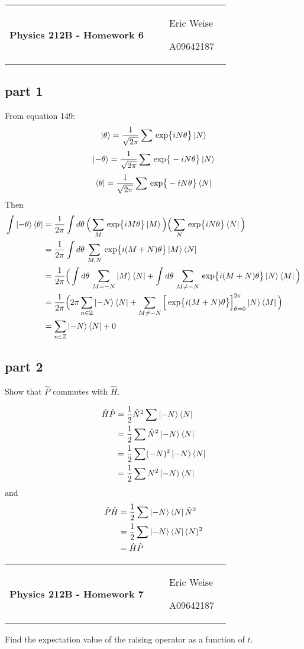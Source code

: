 \documentclass{article}
\newcommand{\assignment}[1]{
    \newpage
    \begin{tabular}{p{0.65\linewidth}p{0.25\linewidth}}
        {\bf\LARGE Physics 212B - Homework #1 }
        &
        \parbox[b]{0.24\textwidth}{
            \hfill Eric Weise

            \hfill A09642187
            }
    \end{tabular}
    \vspace{12pt}
    \newline
}
\newcommand{\D}[1]{{d#1 \,}}
\renewcommand{\exp}[1]{\,\text{exp} \big\{ #1 \big\} }
\begin{document}
\assignment{6}
\subsection*{part 1}
From equation 149:
\[ \ket{\theta} = \frac{1}{\sqrt{2\pi}} \sum \exp{iN\theta} \ket{N} \]
\[ \ket{-\theta} = \frac{1}{\sqrt{2\pi}} \sum \exp{-iN\theta} \ket{N} \]
\[ \bra{\theta} = \frac{1}{\sqrt{2\pi}} \sum \exp{-iN\theta} \bra{N} \]
Then
\begin{align*}
    \int \ket{-\theta}\bra{\theta}
    &= \frac{1}{2\pi} \int \D{\theta} \Big( \sum_M\exp{iM\theta}\ket{M} \Big) \Big( \sum_N \exp{iN\theta}\bra{N} \Big) \\
    &= \frac{1}{2\pi} \int \D{\theta} \sum_{M,N}\exp{i(M+N)\theta}\ket{M}\bra{N} \\
    &= \frac{1}{2\pi} \Big( \int \D{\theta} \sum_{M=-N}\ket{M}\bra{N} + \int \D{\theta} \sum_{M\neq-N} \exp{i(M+N)\theta}\ket{N}\bra{M} \Big) \\
    &= \frac{1}{2\pi} \Big( 2\pi \sum_{n\in\mathbb{Z}} \ket{-N}\bra{N} + \sum_{M\neq-N} \Big[ \exp{i(M+N)\theta}\Big]_{\theta=0}^{2\pi} \ket{N}\bra{M}  \Big) \\
    &= \sum_{n\in\mathbb{Z}} \ket{-N}\bra{N} + 0
\end{align*}

\subsection*{part 2}
Show that $\hat{P}$ commutes with $\hat{H}$.

\begin{align*}
    \hat{H}\hat{P}
    &= \frac{1}{2}\hat{N}^2\sum\ket{-N}\bra{N} \\
    &= \frac{1}{2} \sum \hat{N}^2\ket{-N}\bra{N} \\
    &= \frac{1}{2} \sum (-N)^2\ket{-N}\bra{N} \\
    &= \frac{1}{2} \sum N^2\ket{-N}\bra{N}
\end{align*}
and
\begin{align*}
    \hat{P}\hat{H}
    &= \frac{1}{2} \sum \ket{-N}\bra{N} \hat{N}^2 \\
    &= \frac{1}{2} \sum \ket{-N}\bra{N} (N)^2 \\
    &= \hat{H}\hat{P}
\end{align*}


\assignment{7}
Find the expectation value of the raising operator as a function of $t$.
\end{document}
